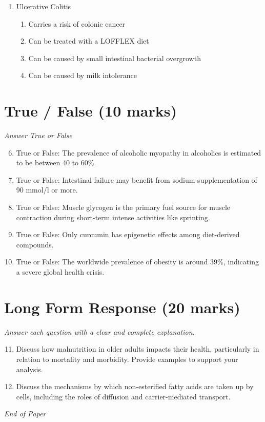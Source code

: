 \documentclass[12pt]{article}
\begin{document}
\begin{enumerate}[label=\arabic*.]
\begin{enumerate}[label=(\alph*)]
    \item Niacin
    \item Riboflavin
    \item Vitamin B$_{6}$
\end{enumerate}
\item Ulcerative Colitis
\begin{enumerate}[label=(\alph*)]
    \item Carries a risk of colonic cancer
    \item Can be treated with a LOFFLEX diet
    \item Can be caused by small intestinal bacterial overgrowth
    \item Can be caused by milk intolerance
\end{enumerate}
\end{enumerate}

\section*{True / False (10 marks)}
\textit{Answer True or False}
\begin{enumerate}[label=\arabic*.]
\setcounter{enumi}{5}
\item True or False: The prevalence of alcoholic myopathy in alcoholics is estimated to be between 40 to 60\%.
\item True or False: Intestinal failure may benefit from sodium supplementation of 90 mmol/l or more.
\item True or False: Muscle glycogen is the primary fuel source for muscle contraction during short-term intense activities like sprinting.
\item True or False: Only curcumin has epigenetic effects among diet-derived compounds.
\item True or False: The worldwide prevalence of obesity is around 39\%, indicating a severe global health crisis.
\end{enumerate}

\section*{Long Form Response (20 marks)}
\textit{Answer each question with a clear and complete explanation.}
\begin{enumerate}[label=\arabic*.]
\setcounter{enumi}{10}
\item Discuss how malnutrition in older adults impacts their health, particularly in relation to mortality and morbidity. Provide examples to support your analysis.
\item Discuss the mechanisms by which non-esterified fatty acids are taken up by cells, including the roles of diffusion and carrier-mediated transport.
\end{enumerate}

\vfill
\noindent\textit{End of Paper}
\end{document}
